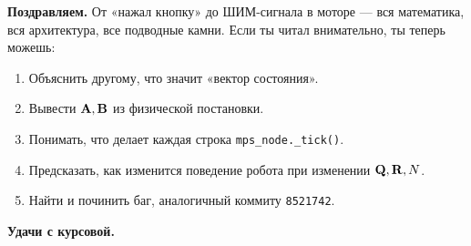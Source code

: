 \medskip
\textbf{Поздравляем.} От «нажал кнопку» до ШИМ-сигнала в моторе ---
вся математика, вся архитектура, все подводные камни. Если ты
читал внимательно, ты теперь можешь:

\begin{enumerate}
  \item Объяснить другому, что значит «вектор состояния».
  \item Вывести $\mathbf{A}, \mathbf{B}$ из физической постановки.
  \item Понимать, что делает каждая строка \texttt{mps\_node.\_tick()}.
  \item Предсказать, как изменится поведение робота при изменении
        $\mathbf{Q}, \mathbf{R}, N$.
  \item Найти и починить баг, аналогичный коммиту \texttt{8521742}.
\end{enumerate}

\textbf{Удачи с курсовой.}
